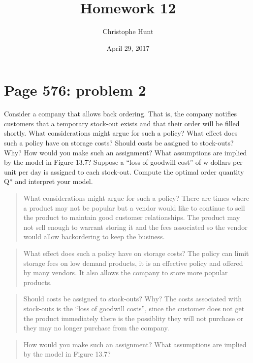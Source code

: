 \documentclass[]{article}
\title{Homework 12}
\author{Christophe Hunt}
\date{April 29, 2017}
\begin{document}
\maketitle

{
\setcounter{tocdepth}{2}
\tableofcontents
}
\section{Page 576: problem 2}\label{page-576-problem-2}

Consider a company that allows back ordering. That is, the company
notifies customers that a temporary stock-out exists and that their
order will be filled shortly. What considerations might argue for such a
policy? What effect does such a policy have on storage costs? Should
costs be assigned to stock-outs? Why? How would you make such an
assignment? What assumptions are implied by the model in Figure 13.7?
Suppose a ``loss of goodwill cost'' of w dollars per unit per day is
assigned to each stock-out. Compute the optimal order quantity Q* and
interpret your model.

\begin{quote}
What considerations might argue for such a policy? There are times where
a product may not be popular but a vendor would like to continue to sell
the product to maintain good customer relationships. The product may not
sell enough to warrant storing it and the fees associated so the vendor
would allow backordering to keep the business.
\end{quote}

\begin{quote}
What effect does such a policy have on storage costs? The policy can
limit storage fees on low demand products, it is an effective policy and
offered by many vendors. It also allows the company to store more
popular products.
\end{quote}

\begin{quote}
Should costs be assigned to stock-outs? Why? The costs associated with
stock-outs is the ``loss of goodwill costs'', since the customer does
not get the product immediately there is the possiblity they will not
purchase or they may no longer purchase from the company.
\end{quote}

\begin{quote}
How would you make such an assignment? What assumptions are implied by
the model in Figure 13.7?
\end{quote}
\end{document}
